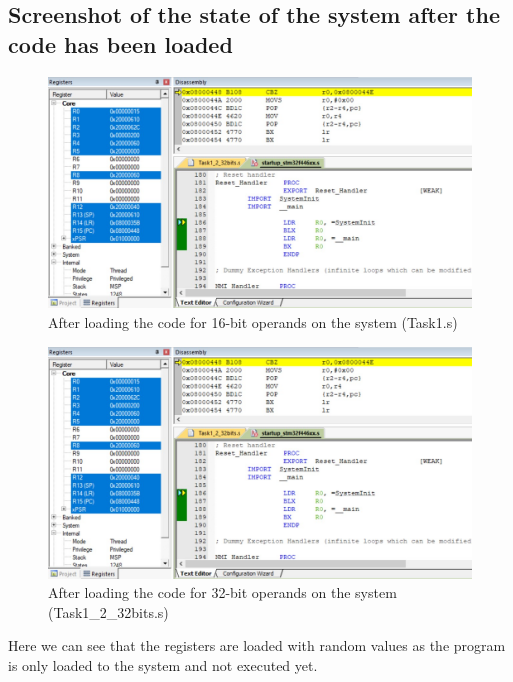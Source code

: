 \documentclass[footheight=20pt, footsepline, headheight=20pt, headsepline]{scrartcl}
\begin{document}
\subsection*{Screenshot of the state of the system after the code has been loaded}
\begin{figure}[ht]
    \centering
    \includegraphics[scale=.7]{images/Task1_1Before1.jpg}
    \caption{After loading the code for 16-bit operands on the system (Task1.s)}
    \label{fig:before_task_one}
\end{figure}
\FloatBarrier
\begin{figure}[ht]
    \centering
    \includegraphics[scale=.7]{images/Task1_1Before1.jpg}
    \caption{After loading the code for 32-bit operands on the system (Task1\_2\_32bits.s)}
    \label{fig:before_task_one_one}
\end{figure}
\FloatBarrier
Here we can see that the registers are loaded with random values as the program is only loaded to the system and not executed yet.
\end{document}
